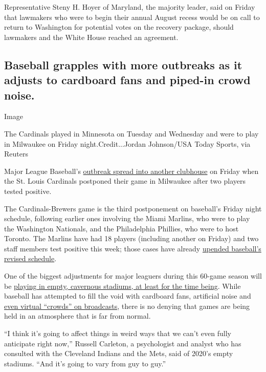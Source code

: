 Representative Steny H. Hoyer of Maryland, the majority leader, said on
Friday that lawmakers who were to begin their annual August recess would
be on call to return to Washington for potential votes on the recovery
package, should lawmakers and the White House reached an agreement.

\hypertarget{baseball-grapples-with-more-outbreaks-as-it-adjusts-to-cardboard-fans-and-piped-in-crowd-noise}{%
\subsection{Baseball grapples with more outbreaks as it adjusts to
cardboard fans and piped-in crowd
noise.}\label{baseball-grapples-with-more-outbreaks-as-it-adjusts-to-cardboard-fans-and-piped-in-crowd-noise}}

Image

The Cardinals played in Minnesota on Tuesday and Wednesday and were to
play in Milwaukee on Friday night.Credit...Jordan Johnson/USA Today
Sports, via Reuters

Major League Baseball's
\href{https://www.nytimes3xbfgragh.onion/2020/07/31/sports/baseball/cardinals-twins-coronavirus-mlb.html}{outbreak
spread into another clubhouse} on Friday when the St. Louis Cardinals
postponed their game in Milwaukee after two players tested positive.

The Cardinals-Brewers game is the third postponement on baseball's
Friday night schedule, following earlier ones involving the Miami
Marlins, who were to play the Washington Nationals, and the Philadelphia
Phillies, who were to host Toronto. The Marlins have had 18 players
(including another on Friday) and two staff members test positive this
week; those cases have already
\href{https://www.nytimes3xbfgragh.onion/2020/07/28/sports/baseball/marlins-outbreak-mlb-coronavirus.html}{upended
baseball's revised schedule}.

One of the biggest adjustments for major leaguers during this 60-game
season will be
\href{https://www.nytimes3xbfgragh.onion/2020/07/31/sports/baseball/baseball-empty-stadiums-effects.html}{playing
in empty, cavernous stadiums, at least for the time being}. While
baseball has attempted to fill the void with cardboard fans, artificial
noise and \href{https://www.youtube.com/watch?v=q_FQcKH4xL4}{even
virtual ``crowds'' on broadcasts}, there is no denying that games are
being held in an atmosphere that is far from normal.

``I think it's going to affect things in weird ways that we can't even
fully anticipate right now,'' Russell Carleton, a psychologist and
analyst who has consulted with the Cleveland Indians and the Mets, said
of 2020's empty stadiums. ``And it's going to vary from guy to guy.''

